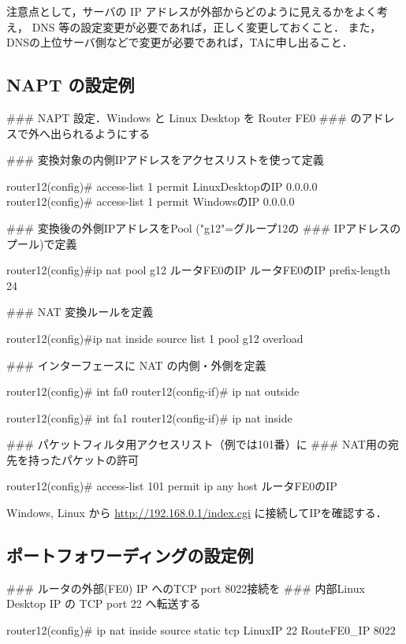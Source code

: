 注意点として，サーバの IP アドレスが外部からどのように見えるかをよく考え，
DNS 等の設定変更が必要であれば，正しく変更しておくこと．
また，DNSの上位サーバ側などで変更が必要であれば，TAに申し出ること．

\subsection{NAPT の設定例}

\begin{cli}

### NAPT 設定．Windows と Linux Desktop を Router FE0
### のアドレスで外へ出られるようにする

### 変換対象の内側IPアドレスをアクセスリストを使って定義

router12(config)# access-list 1 permit LinuxDesktopのIP  0.0.0.0
router12(config)# access-list 1 permit WindowsのIP  0.0.0.0

### 変換後の外側IPアドレスをPool ("g12"=グループ12の
### IPアドレスのプール)で定義

router12(config)#ip nat pool g12  ルータFE0のIP  ルータFE0のIP  prefix-length 24

### NAT 変換ルールを定義

router12(config)#ip nat inside source list 1 pool g12 overload

### インターフェースに NAT の内側・外側を定義

router12(config)# int fa0
router12(config-if)# ip nat outside

router12(config)# int fa1
router12(config-if)# ip nat inside

### パケットフィルタ用アクセスリスト（例では101番）に
### NAT用の宛先を持ったパケットの許可

router12(config)# access-list 101 permit ip any host ルータFE0のIP

\end{cli}

Windows, Linux から \url{http://192.168.0.1/index.cgi} に接続してIPを確認する．

\subsection{ポートフォワーディングの設定例}

\begin{cli}

### ルータの外部(FE0) IP へのTCP port 8022接続を
### 内部Linux Desktop IP の TCP port 22 へ転送する

router12(config)# ip nat inside source static tcp LinuxIP 22 RouteFE0_IP 8022
\end{cli}

